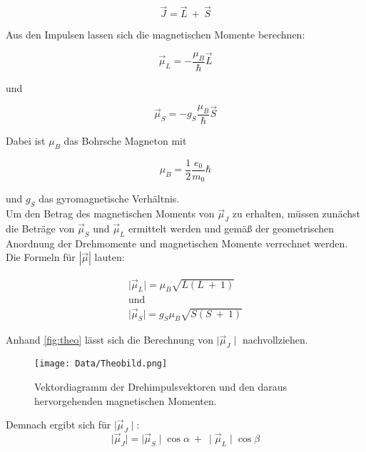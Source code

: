 \begin{equation}
    \vec{J} = \vec{L}\ +\ \vec{S}
\end{equation}

Aus den Impulsen lassen sich die magnetischen Momente berechnen:

\begin{equation}
    \vec{\mu}_L = -\frac{\mu_B}{\hbar}\vec{L}
\end{equation}

und

\begin{equation}
    \vec{\mu}_S = -g_S\frac{\mu_B}{\hbar}\vec{S}
\end{equation}

Dabei ist $\mu_B$ das Bohrsche Magneton mit 

\begin{equation}
    \mu_B = \frac{1}{2}\frac{e_0}{m_0}\hbar
\end{equation}

und $g_S$ das gyromagnetische Verhältnis.\\
Um den Betrag des magnetischen Moments von $\vec{\mu}_J$ zu erhalten, müssen zunächst die Beträge von $\vec{\mu}_S$ und $\vec{\mu}_L$ ermittelt werden und gemäß der geometrischen Anordnung der Drehmomente und magnetischen Momente verrechnet werden.\\
Die Formeln für $|\vec{\mu}|$ lauten:

\begin{align*}
    \mid\vec{\mu}_L\mid = \mu_B \sqrt{L(L\ +\ 1)}\\
    \text{und     }\\
    \mid\vec{\mu}_S\mid = g_S \mu_B \sqrt{S(S\ +\ 1)}
\end{align*}

Anhand \autoref{fig:theo} lässt sich die Berechnung von $\mid \vec{\mu}_J \mid$ nachvollziehen.

\begin{figure}[htbp]
    \centering
    \texttt{[image: Data/Theobild.png]}
    \caption{Vektordiagramm der Drehimpulsvektoren und den daraus hervorgehenden magnetischen Momenten.}
    \label{fig:theo}
\end{figure}

Demnach ergibt sich für $\mid\vec{\mu}_J\mid$:
\begin{equation}
    \mid\vec{\mu}_J\mid = \mid\vec{\mu}_S\mid \cos\alpha \ +\ \mid\vec{\mu}_L\mid \cos\beta
\end{equation}

